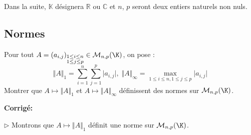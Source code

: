 \documentclass[a4paper,twoside,french,11pt]{VcCours}
\newcommand{\corr}{\textbf{Corrigé:}}
\begin{document}

\tableofcontents
\separationTitre


Dans la suite, $\mathbb{K}$ désignera $\mathbb{R}$ ou $\mathbb{C}$ et $n$, $p$ seront deux entiers naturels non nuls.


\subsection{Normes}




\begin{Exercice}{} Pour tout $A = (a_{i,j})_{\substack{1 \leq i \leq n \\ 1 \leq j \leq p}} \in \mathcal{M}_{n,p}(\K)$, on pose :
$$\Vert A \Vert_{1}  = \sum_{i = 1}^{n} \sum_{j = 1}^{p} \vert a_{i,j} \vert, \; \Vert A \Vert_{\infty}  = \max_{1 \leq i \leq n,1 \leq j \leq p} \vert a_{i,j} \vert $$
Montrer que $A \mapsto \Vert A \Vert_{1}$ et $A \mapsto \Vert A \Vert_{\infty}$ définissent des normes sur $\mathcal{M}_{n,p}(\K)$.
\end{Exercice}

\corr 

$\rhd$ Montrons que $A \mapsto \Vert A \Vert_{1}$ définit une norme sur $\mathcal{M}_{n,p}(\K)$.
\end{document}
